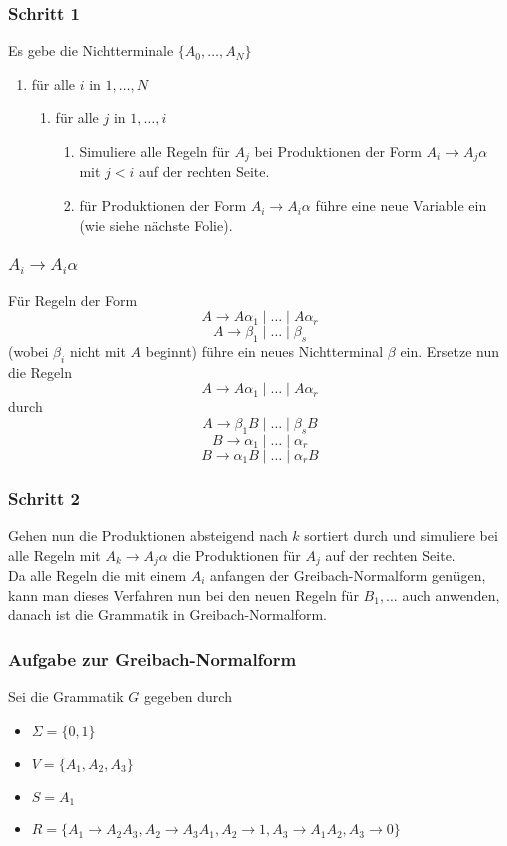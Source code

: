\documentclass{beamer}
\begin{document}
{\begin{frame}
\frametitle{Schritt 1}
Es gebe die Nichtterminale $\{A_0, \ldots, A_N\}$
\begin{enumerate}
\item für alle $i$ in $1, \ldots, N$
\begin{enumerate}
\item für alle $j$ in $1, \ldots, i$
\begin{enumerate}
\item Simuliere alle Regeln für $A_j$ bei Produktionen der Form $A_i \rightarrow A_j\alpha$ mit $j < i$ auf der rechten Seite.
\item für Produktionen der Form $A_i \rightarrow A_i\alpha$ führe eine neue Variable ein (wie siehe nächste Folie).
\end{enumerate}
\end{enumerate}
\end{enumerate}
\end{frame}

\begin{frame}
\frametitle{$A_i \rightarrow A_i\alpha$}
Für Regeln der Form 
$$A \rightarrow A\alpha_1 \mid \ldots \mid A\alpha_r$$
$$A \rightarrow \beta_1 \mid \ldots \mid \beta_s$$
(wobei $\beta_i$ nicht mit $A$ beginnt) führe ein neues Nichtterminal $\beta$ ein. Ersetze nun die Regeln
$$A \rightarrow A\alpha_1 \mid \ldots \mid A\alpha_r$$
durch
$$A \rightarrow \beta_1B \mid \ldots \mid \beta_sB$$
$$B \rightarrow \alpha_1 \mid \ldots \mid \alpha_r$$
$$B \rightarrow \alpha_1B \mid \ldots \mid \alpha_rB$$
\end{frame}

\begin{frame}
 \frametitle{Schritt 2}
Gehen nun die Produktionen absteigend nach $k$ sortiert durch und simuliere bei alle Regeln mit $A_k \rightarrow A_j\alpha$ die Produktionen für $A_j$ auf der rechten Seite.\\
Da alle Regeln die mit einem $A_i$ anfangen der Greibach-Normalform genügen, kann man dieses Verfahren nun bei den neuen Regeln für $B_1,\ldots$ auch anwenden, danach ist die Grammatik in Greibach-Normalform.
\end{frame}

\begin{frame}
\frametitle{Aufgabe zur Greibach-Normalform}
Sei die Grammatik $G$ gegeben durch
\begin{itemize}
 \item $\Sigma = \{0, 1\}$
 \item $V = \{A_1, A_2, A_3\}$
 \item $S = A_1$
 \item $R = \{A_1 \rightarrow A_2A_3, A_2 \rightarrow A_3A_1, A_2 \rightarrow 1, A_3 \rightarrow A_1A_2, A_3 \rightarrow 0\}$
\end{itemize}


\end{frame}}
\end{document}
